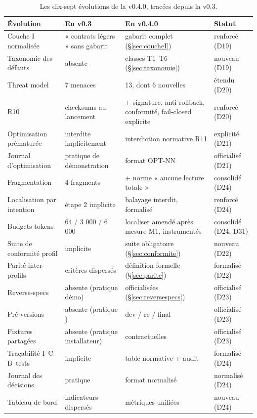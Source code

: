\begin{table}[htbp]
\centering\small
\caption{Les dix-sept évolutions de la v0.4.0, tracées depuis la v0.3.}
\label{tab:correspondance}
\begin{tabularx}{\textwidth}{@{}l Y Y l@{}}
\toprule
\textbf{Évolution} & \textbf{En v0.3} & \textbf{En v0.4.0} & \textbf{Statut} \\
\midrule
Couche I normalisée & « contrats légers » sans gabarit & gabarit complet
(§\ref{sec:coucheI}) & renforcé (D19) \\
Taxonomie des défauts & absente & classes T1–T6 (§\ref{sec:taxonomie}) & nouveau (D19) \\
Threat model & 7 menaces & 13, dont 6 nouvelles & étendu (D20) \\
R10 & checksums au lancement & + signature, anti-rollback, conformité, fail-closed
explicite & renforcé (D20) \\
Optimisation prématurée & interdite implicitement & interdiction normative R11 &
explicité (D21) \\
Journal d'optimisation & pratique de démonstration & format OPT-NN & officialisé (D21) \\
Fragmentation & 4 fragments & + norme « aucune lecture totale » & consolidé (D24) \\
Localisation par intention & étape 2 implicite & balayage interdit, formalisé &
renforcé (D24) \\
Budgets tokens & 64 / 3 000 / 6 000 & localiser amendé après mesure M1, instrumentés & consolidé (D24, D31) \\
Suite de conformité profil & implicite & suite obligatoire (§\ref{sec:conformite}) &
nouveau (D22) \\
Parité inter-profils & critères dispersés & définition formelle (§\ref{sec:parite}) &
formalisé (D22) \\
Reverse-specs & absente (pratique démo) & officialisées (§\ref{sec:reversespecs}) &
officialisé (D23) \\
Pré-versions & absente (pratique ) & dev / rc / final & officialisé (D23) \\
Fixtures partagées & absente (pratique installateur) & contractuelles & officialisé
(D23) \\
Traçabilité I–C–B–tests & implicite & table normative + audit & formalisé (D24) \\
Journal des décisions & pratique & format normalisé & normalisé (D24) \\
Tableau de bord & indicateurs dispersés & métriques unifiées & nouveau (D24) \\
\bottomrule
\end{tabularx}
\end{table}

